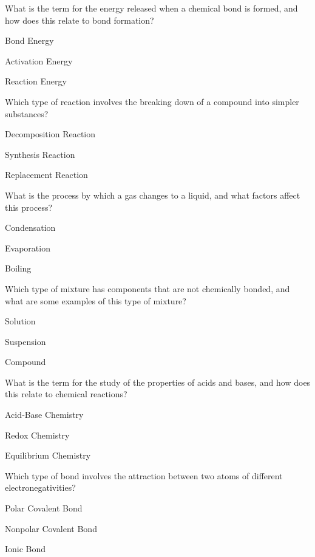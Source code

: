 \begin{enhancedmcq}{What is the term for the energy released when a chemical bond is formed, and how does this relate to bond formation?}
\item Bond Energy
\item Activation Energy
\item Reaction Energy

\end{enhancedmcq}
\begin{enhancedmcq}{Which type of reaction involves the breaking down of a compound into simpler substances?}
\item Decomposition Reaction
\item Synthesis Reaction
\item Replacement Reaction

\end{enhancedmcq}
\begin{enhancedmcq}{What is the process by which a gas changes to a liquid, and what factors affect this process?}
\item Condensation
\item Evaporation
\item Boiling

\end{enhancedmcq}
\begin{enhancedmcq}{Which type of mixture has components that are not chemically bonded, and what are some examples of this type of mixture?}
\item Solution
\item Suspension
\item Compound

\end{enhancedmcq}
\begin{enhancedmcq}{What is the term for the study of the properties of acids and bases, and how does this relate to chemical reactions?}
\item Acid‑Base Chemistry
\item Redox Chemistry
\item Equilibrium Chemistry

\end{enhancedmcq}
\begin{enhancedmcq}{Which type of bond involves the attraction between two atoms of different electronegativities?}
\item Polar Covalent Bond
\item Nonpolar Covalent Bond
\item Ionic Bond

\end{enhancedmcq}
